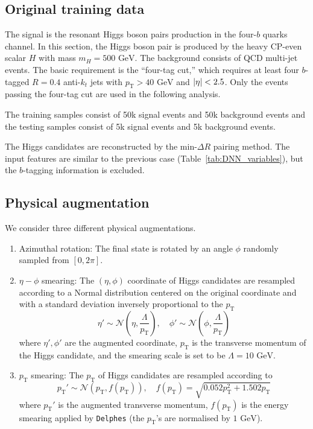 \documentclass[12pt]{article}
\begin{document}
	\subsection{Original training data}%
	\label{sub:original_training_data}
		The signal is the resonant Higgs boson pairs production in the four-$b$ quarks channel. In this section, the Higgs boson pair is produced by the heavy CP-even scalar $H$ with mass $m_H = \text{500 GeV}$. The background consists of QCD multi-jet events. The basic requirement is the ``four-tag cut,'' which requires at least four $b$-tagged $R = 0.4$ anti-$k_t$ jets with $p_\text{T} > \text{40 GeV}$ and $\abs{\eta} < 2.5$. Only the events passing the four-tag cut are used in the following analysis.
		
		The training samples consist of 50k signal events and 50k background events and the testing samples consist of 5k signal events and 5k background events.

		The Higgs candidates are reconstructed by the $\text{min-}\Delta R$ pairing method. The input features are similar to the previous case (Table~\ref{tab:DNN_variables}), but the $b$-tagging information is excluded.
	\subsection{Physical augmentation}%
	\label{sub:physical_augmentation}
		We consider three different physical augmentations.

		\begin{enumerate}
			\item Azimuthal rotation: The final state is rotated by an angle $\phi$ randomly sampled from $[0, 2\pi]$.
			\item $\eta-\phi$ smearing: The $\left( \eta,\phi \right) $ coordinate of Higgs candidates are resampled according to a Normal distribution centered on the original coordinate and with a standard deviation inversely proportional to the $p_{\text{T}}$
				\begin{equation}
					\eta' \sim \mathcal{N}\left(\eta, \frac{\Lambda}{p_{\text{T}}}\right), \quad \phi' \sim \mathcal{N}\left(\phi, \frac{\Lambda}{p_{\text{T}}}\right)
				\end{equation}
				where $\eta', \phi'$ are the augmented coordinate, $p_{\text{T}}$ is the transverse momentum of the Higgs candidate, and the smearing scale is set to be $\Lambda = \text{10 GeV}$.
			\item $p_\text{T}$ smearing: The $p_{\text{T}}$ of Higgs candidates are resampled according to
				\begin{equation}
					p_{\text{T}}' \sim \mathcal{N}\left( p_{\text{T}}, f(p_{\text{T}}) \right), \quad f(p_{\text{T}}) = \sqrt{0.052 p_{\text{T}}^2 + 1.502p_{\text{T}}}
				\end{equation}
				where $p_{\text{T}}'$ is the augmented transverse momentum, $f\left( p_\text{T} \right) $ is the energy smearing applied by \verb|Delphes| (the $p_{\text{T}}$'s are normalised by $\text{1 GeV}$).
		\end{enumerate}
\end{document}
